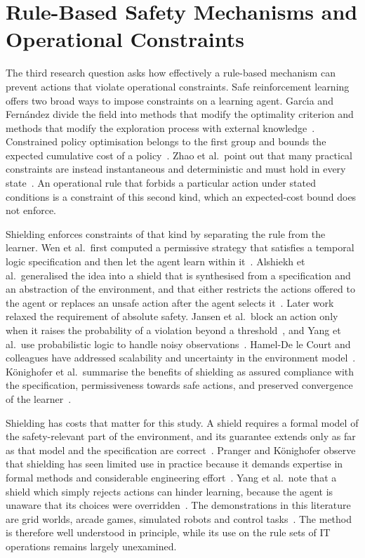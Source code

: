 \documentclass[12pt,a4paper]{article}
\begin{document}
\section{Rule-Based Safety Mechanisms and Operational Constraints}

The third research question asks how effectively a rule-based mechanism can prevent actions that violate operational constraints. Safe reinforcement learning offers two broad ways to impose constraints on a learning agent. Garc\'{\i}a and Fern\'{a}ndez divide the field into methods that modify the optimality criterion and methods that modify the exploration process with external knowledge~\cite{garcia2015}. Constrained policy optimisation belongs to the first group and bounds the expected cumulative cost of a policy~\cite{achiam2017,wachi2024}. Zhao et al.\ point out that many practical constraints are instead instantaneous and deterministic and must hold in every state~\cite{zhao2023}. An operational rule that forbids a particular action under stated conditions is a constraint of this second kind, which an expected-cost bound does not enforce.

Shielding enforces constraints of that kind by separating the rule from the learner. Wen et al.\ first computed a permissive strategy that satisfies a temporal logic specification and then let the agent learn within it~\cite{wen2015}. Alshiekh et al.\ generalised the idea into a shield that is synthesised from a specification and an abstraction of the environment, and that either restricts the actions offered to the agent or replaces an unsafe action after the agent selects it~\cite{alshiekh2018}. Later work relaxed the requirement of absolute safety. Jansen et al.\ block an action only when it raises the probability of a violation beyond a threshold~\cite{jansen2020}, and Yang et al.\ use probabilistic logic to handle noisy observations~\cite{yang2023}. Hamel-De le Court and colleagues have addressed scalability and uncertainty in the environment model~\cite{hamel2025,hamel2026}. K\"{o}nighofer et al.\ summarise the benefits of shielding as assured compliance with the specification, permissiveness towards safe actions, and preserved convergence of the learner~\cite{konighofer2025}.

Shielding has costs that matter for this study. A shield requires a formal model of the safety-relevant part of the environment, and its guarantee extends only as far as that model and the specification are correct~\cite{konighofer2025}. Pranger and K\"{o}nighofer observe that shielding has seen limited use in practice because it demands expertise in formal methods and considerable engineering effort~\cite{pranger2026}. Yang et al.\ note that a shield which simply rejects actions can hinder learning, because the agent is unaware that its choices were overridden~\cite{yang2023}. The demonstrations in this literature are grid worlds, arcade games, simulated robots and control tasks~\cite{alshiekh2018,jansen2020,achiam2017}. The method is therefore well understood in principle, while its use on the rule sets of IT operations remains largely unexamined.
\end{document}
